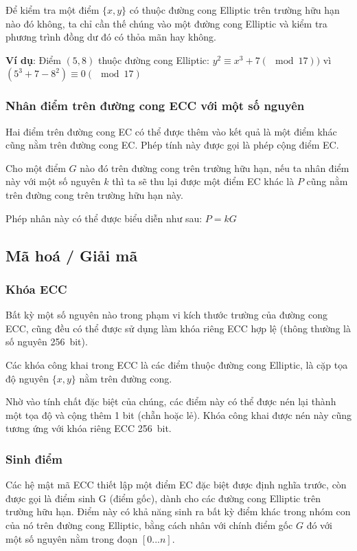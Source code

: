 Để kiểm tra một điểm $\{x,y\}$ có thuộc đường cong Elliptic trên trường hữu hạn nào đó không, ta chỉ cần thế chúng vào một đường cong Elliptic và kiểm tra phương trình đồng dư đó có thỏa mãn hay không.

\textbf{Ví dụ}: Điểm $(5,8)$ thuộc đường cong Elliptic: $y^2\equiv x^3+7 (\mod 17))$ vì $(5^3+7-8^2)\equiv 0 (\mod 17)$





\subsubsection{Nhân điểm trên đường cong ECC với một số nguyên}

Hai điểm trên đường cong EC có thể được thêm vào kết quả là một điểm khác cũng nằm trên đường cong EC. Phép tính này được gọi là phép cộng điểm EC.

Cho một điểm $G$ nào đó trên đường cong trên trường hữu hạn, nếu ta nhân điểm này với một số nguyên $k$ thì ta sẽ thu lại được một điểm EC khác là $P$ cũng nằm trên đường cong trên trường hữu hạn này. 

Phép nhân này có thể được biểu diễn như sau: $P=kG$

\subsection{Mã hoá / Giải mã}

\subsubsection{Khóa ECC}

Bất kỳ một số nguyên nào trong phạm vi kích thước trường của đường cong ECC, cũng đều có thể được sử dụng làm khóa riêng ECC hợp lệ (thông thường là số nguyên 256~bit).

Các khóa công khai trong ECC là các điểm thuộc đường cong Elliptic, là cặp tọa độ nguyên $\{x, y\}$ nằm trên đường cong. 

Nhờ vào tính chất đặc biệt của chúng, các điểm này có thể được nén lại thành một tọa độ và cộng thêm 1 bit (chẵn hoặc lẻ). Khóa công khai được nén này cũng tương ứng với khóa riêng ECC 256~bit.

\subsubsection{Sinh điểm}

Các hệ mật mã ECC thiết lập một điểm EC đặc biệt được định nghĩa trước, còn được gọi là điểm sinh G (điểm gốc), dành cho các đường cong Elliptic trên trường hữu hạn. Điểm này có khả năng sinh ra bất kỳ điểm khác trong nhóm con của nó trên đường cong Elliptic, bằng cách nhân với chính điểm gốc $G$ đó với một số nguyên nằm trong đoạn $[0...n]$.

